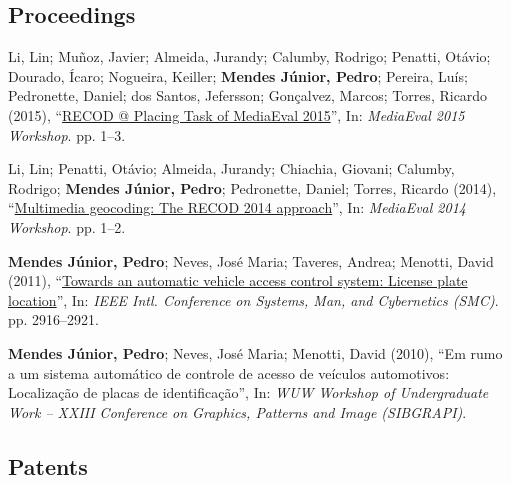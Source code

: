 \documentclass{article}
\begin{document}
\subsection*{Proceedings}

\begin{enumerate}[label={[\arabic*]},resume]
\item\label{ref:Li2015} Li, Lin; Muñoz, Javier; Almeida, Jurandy; Calumby, Rodrigo; Penatti, Otávio; Dourado, Ícaro; Nogueira, Keiller; \textbf{Mendes Júnior, Pedro}; Pereira, Luís; Pedronette, Daniel; dos Santos, Jefersson; Gonçalvez, Marcos; Torres, Ricardo (2015), ``\href{http://ceur-ws.org/Vol-1436/Paper49.pdf}{RECOD @ Placing Task of MediaEval 2015}'', In: \emph{MediaEval 2015 Workshop}. pp. 1--3.
\item\label{ref:Li2014} Li, Lin; Penatti, Otávio; Almeida, Jurandy; Chiachia, Giovani; Calumby, Rodrigo; \textbf{Mendes Júnior, Pedro}; Pedronette, Daniel; Torres, Ricardo (2014), ``\href{http://ceur-ws.org/Vol-1263/mediaeval2014_submission_81.pdf}{Multimedia geocoding: The RECOD 2014 approach}'', In: \emph{MediaEval 2014 Workshop}. pp. 1--2.
\item\label{ref:MendesJunior2011} \textbf{Mendes Júnior, Pedro}; Neves, José Maria; Taveres, Andrea; Menotti, David (2011), ``\href{http://dx.doi.org/10.1109/icsmc.2011.6084108}{Towards an automatic vehicle access control system: License plate location}'', In: \emph{IEEE Intl. Conference on Systems, Man, and Cybernetics (SMC)}. pp. 2916--2921.
\item\label{ref:MendesJunior2010} \textbf{Mendes Júnior, Pedro}; Neves, José Maria; Menotti, David (2010), ``Em rumo a um sistema automático de controle de acesso de veículos automotivos: Localização de placas de identificação'', In: \emph{WUW Workshop of Undergraduate Work -- XXIII Conference on Graphics, Patterns and Image (SIBGRAPI)}.
\end{enumerate}

\subsection*{Patents}
\end{document}
